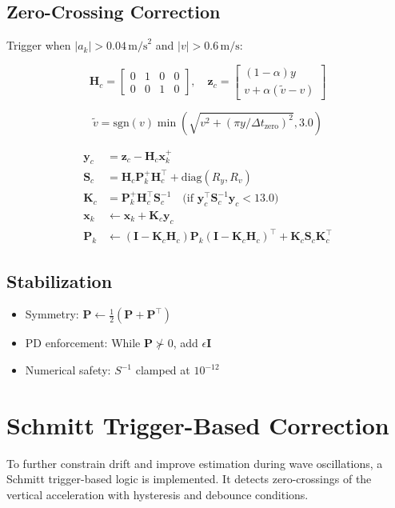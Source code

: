 \documentclass[11pt,letterpaper]{article}
\begin{document}
\subsection{Zero-Crossing Correction}
Trigger when $|a_k| > 0.04\,\text{m/s}^2$ and $|v| > 0.6\,\text{m/s}$:

\begin{equation}
\bm{H}_c = \begin{bmatrix}0&1&0&0\\0&0&1&0\end{bmatrix}, \quad
\bm{z}_c = \begin{bmatrix}(1-\alpha)y\\v+\alpha(\tilde{v}-v)\end{bmatrix}
\end{equation}

\begin{equation}
\tilde{v} = \mathrm{sgn}(v)\min\left(\sqrt{v^2 + (\pi y/\Delta t_\mathrm{zero})^2}, 3.0\right)
\end{equation}

\begin{align}
\bm{y}_c &= \bm{z}_c - \bm{H}_c\bm{x}_k^+ \\
\bm{S}_c &= \bm{H}_c\bm{P}_k^+\bm{H}_c^\top + \mathrm{diag}(R_y, R_v) \\
\bm{K}_c &= \bm{P}_k^+\bm{H}_c^\top \bm{S}_c^{-1} \quad \text{(if $\bm{y}_c^\top\bm{S}_c^{-1}\bm{y}_c < 13.0$)} \\
\bm{x}_k &\leftarrow \bm{x}_k + \bm{K}_c\bm{y}_c \\
\bm{P}_k &\leftarrow (\bm{I}-\bm{K}_c\bm{H}_c)\bm{P}_k(\bm{I}-\bm{K}_c\bm{H}_c)^\top + \bm{K}_c\bm{S}_c\bm{K}_c^\top
\end{align}

\subsection{Stabilization}
\begin{itemize}
\item Symmetry: $\bm{P} \leftarrow \frac{1}{2}(\bm{P}+\bm{P}^\top)$
\item PD enforcement: While $\bm{P} \not\succ 0$, add $\epsilon\bm{I}$
\item Numerical safety: $S^{-1}$ clamped at $10^{-12}$
\end{itemize}


\section{Schmitt Trigger-Based Correction}
To further constrain drift and improve estimation during wave oscillations, a Schmitt trigger-based logic is implemented. It detects zero-crossings of the vertical acceleration with hysteresis and debounce conditions.
\end{document}
